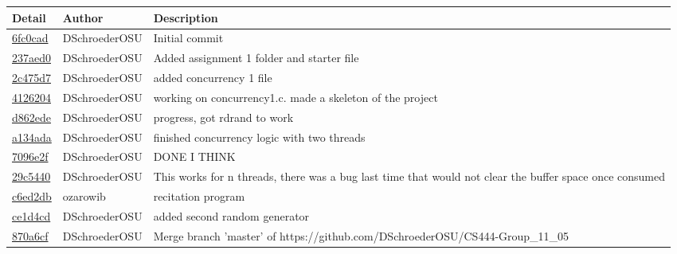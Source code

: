 \documentclass[10pt,letterpaper,draftclsnofoot,onecolumn]{IEEEtran}
\begin{document}
\begin{tabular}{l l l}\textbf{Detail} & \textbf{Author} & \textbf{Description}\\\hline
\href{https://github.com/DSchroederOSU/CS444-Group\_11\_05/commit/6fc0cad45a2a515f54c120fa6d411cbb62a0eed5}{6fc0cad} & DSchroederOSU & Initial commit\\\hline
\href{https://github.com/DSchroederOSU/CS444-Group\_11\_05/commit/237aed09afe1e61e9421f419164f4d41387adddd}{237aed0} & DSchroederOSU & Added assignment 1 folder and starter file\\\hline
\href{https://github.com/DSchroederOSU/CS444-Group\_11\_05/commit/2c475d7e15d1a54406c275a2a27c5df472c46ded}{2c475d7} & DSchroederOSU & added concurrency 1 file\\\hline
\href{https://github.com/DSchroederOSU/CS444-Group\_11\_05/commit/4126204c49cd2e10090eb4d6bd3183bc23c94648}{4126204} & DSchroederOSU & working on concurrency1.c. made a skeleton of the project\\\hline
\href{https://github.com/DSchroederOSU/CS444-Group\_11\_05/commit/d862edec54dd0eb51bdde6e26337315a2675d434}{d862ede} & DSchroederOSU & progress, got rdrand to work\\\hline
\href{https://github.com/DSchroederOSU/CS444-Group\_11\_05/commit/a134adaeeff0b0ebc7bc662d809edc973ab6f841}{a134ada} & DSchroederOSU & finished concurrency logic with two threads\\\hline
\href{https://github.com/DSchroederOSU/CS444-Group\_11\_05/commit/7096e2f214d8f164dcf02c58d8924f903281e867}{7096e2f} & DSchroederOSU & DONE I THINK\\\hline
\href{https://github.com/DSchroederOSU/CS444-Group\_11\_05/commit/29c5440b4d14c3656d11c907e8794f6f08d98897}{29c5440} & DSchroederOSU & This works for n threads, there was a bug last time that would not clear the buffer space once consumed\\\hline
\href{https://github.com/DSchroederOSU/CS444-Group\_11\_05/commit/c6ed2db4aab53f542abd8a00c05c9cf7953d9712}{c6ed2db} & ozarowib & recitation program\\\hline
\href{https://github.com/DSchroederOSU/CS444-Group\_11\_05/commit/ce1d4cd2a712b1dfed27d304539fd552d15c4c6c}{ce1d4cd} & DSchroederOSU & added second random generator\\\hline
\href{https://github.com/DSchroederOSU/CS444-Group\_11\_05/commit/870a6cf75e9cf205425b40b0fd90a21bece56299}{870a6cf} & DSchroederOSU & Merge branch 'master' of https://github.com/DSchroederOSU/CS444-Group\_11\_05\\\hline

\end{tabular}
\end{document}

